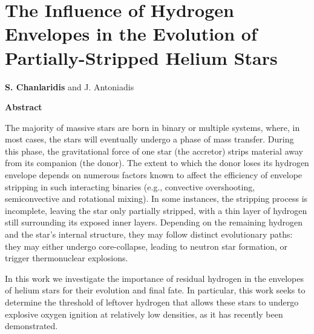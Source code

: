 \documentclass[main.tex]{subfiles}
\begin{document}
    \chapter[The Influence of Hydrogen Envelopes in the Evolution of Partially-Stripped Helium Stars]{The Influence of Hydrogen Envelopes in the Evolution of Partially-Stripped Helium Stars}

    \begin{center}
        \textbf{S. Chanlaridis} and J. Antoniadis \\
    \end{center}

        
        
    \begin{center}
        \textbf{\large Abstract}
    \end{center}
    
    The majority of massive stars are born in binary or multiple systems, where, in most cases, the stars will eventually undergo a phase of mass transfer. During this phase, the gravitational force of one star (the accretor) strips material away from its companion (the donor). 
    The extent to which the donor loses its hydrogen envelope depends on numerous factors known to affect the efficiency of envelope stripping in such interacting binaries (e.g., convective overshooting, semiconvective and rotational mixing). In some instances, the stripping process is incomplete, leaving the star only partially stripped, with a thin layer of hydrogen still surrounding its exposed inner layers. Depending on the remaining hydrogen and the star’s internal structure, they may follow distinct evolutionary paths: they may either undergo core-collapse, leading to neutron star formation, or trigger thermonuclear explosions.

    In this work we investigate the importance of residual hydrogen in the envelopes of helium stars for their evolution and final fate. In particular, this work seeks to determine the threshold of leftover hydrogen that allows these stars to undergo explosive oxygen ignition at relatively low densities, as it has recently been demonstrated.
\end{document}
